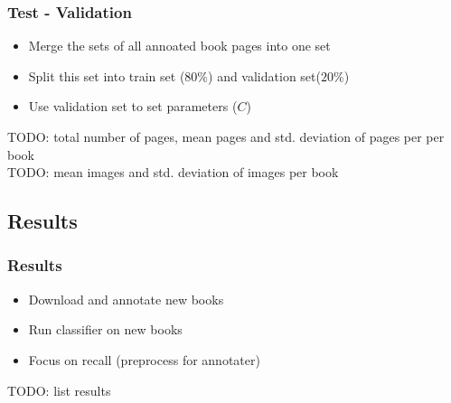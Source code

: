 \begin{frame}
\frametitle{Test - Validation}
\begin{itemize}
\item Merge the sets of all annoated book pages into one set
\item Split this set into train set ($80\%$) and validation set($20\%$)
\item Use validation set to set parameters ($C$)
\end{itemize}
TODO: total number of pages, mean pages and std. deviation of pages per per book \\
TODO: mean images and std. deviation of images per book
\end{frame}

\subsection{Results}
\begin{frame}
\frametitle{Results}
\begin{itemize}
\item Download and annotate new books
\item Run classifier on new books
\item Focus on recall (preprocess for annotater)
\end{itemize}
TODO: list results

\end{frame}
